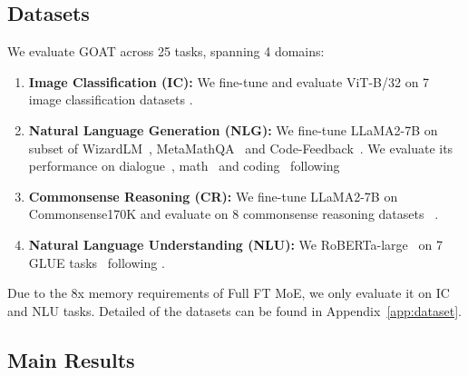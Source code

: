\subsection{Datasets}
We evaluate GOAT across 25 tasks, spanning 4 domains: 
\begin{enumerate}
\item  \textbf{Image Classification (IC):} We fine-tune and evaluate ViT-B/32 \cite{radford2021learningtransferablevisualmodels} on 7 image classification datasets \cite{ilharco2023editingmodelstaskarithmetic}.
\item \textbf{Natural Language Generation (NLG):} We fine-tune LLaMA2-7B \cite{touvron2023llama2openfoundation} on subset of WizardLM~\cite{xu2023wizardlm}, MetaMathQA~\cite{yumetamath} and Code-Feedback~\cite{zheng2024opencodeinterpreter}. We evaluate its performance on dialogue~\cite{zheng2023judging}, math~\cite{cobbe2021training} and coding~\cite{chen2021evaluating} following \citet{wang2024loraprolowrankadaptersproperly}
\item \textbf{Commonsense Reasoning (CR):} We fine-tune LLaMA2-7B on Commonsense170K and evaluate on 8 commonsense reasoning datasets ~\cite{hu-etal-2023-llm}. 
\item \textbf{Natural Language Understanding (NLU):} We RoBERTa-large~\cite{liu2020roberta} on 7 GLUE tasks~\cite{wang2018glue} following \cite{hulora}. 
\end{enumerate}
Due to the 8x memory requirements of Full FT MoE, we only evaluate it on IC and NLU tasks. Detailed of the datasets can be found in Appendix~\ref{app:dataset}.

\subsection{Main Results}\label{sec:ex}

